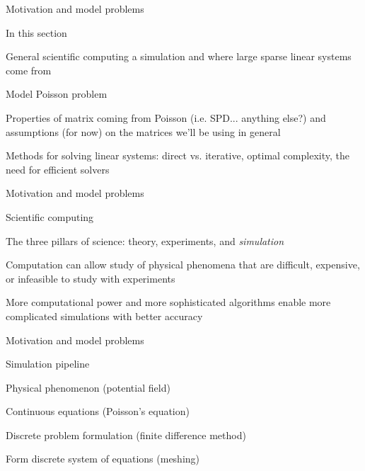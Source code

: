 \documentclass[18pt,xcolor=table]{beamer}
\begin{document}
\begin{frame}{Motivation and model problems}
\begin{block}{In this section}
\bit
\item General scientific computing a simulation and where large sparse linear systems come from
\item Model Poisson problem
\item Properties of matrix coming from Poisson (i.e. SPD... anything else?) and assumptions (for now) on the matrices we'll be using in general
\item Methods for solving linear systems: direct vs. iterative, optimal complexity, the need for efficient solvers
\eit
\end{block}

\end{frame}

\begin{frame}{Motivation and model problems}
\begin{block}{Scientific computing}
\bit
\item The three pillars of science: theory, experiments, and \emph{simulation}
\item Computation can allow study of physical phenomena that are difficult, expensive, or infeasible to study with experiments
\item More computational power and more sophisticated algorithms enable more complicated simulations with better accuracy
\eit
\end{block}

\end{frame}

\begin{frame}{Motivation and model problems}
\begin{block}{Simulation pipeline}
\bit
\item Physical phenomenon (potential field)
\item Continuous equations (Poisson's equation)
\item Discrete problem formulation (finite difference method)
\item Form discrete system of equations (meshing)
\eit
\end{block}

\end{frame}
\end{document}
